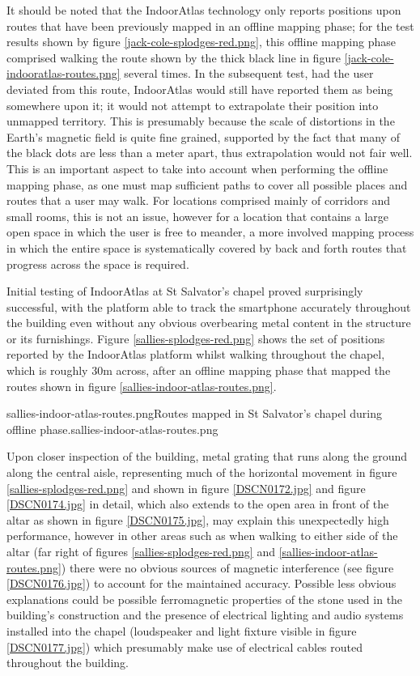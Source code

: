 It should be noted that the IndoorAtlas technology only reports positions upon routes that have been previously mapped in an offline mapping phase; for the test results shown by figure \ref{jack-cole-splodges-red.png}, this offline mapping phase comprised walking the route shown by the thick black line in figure \ref{jack-cole-indooratlas-routes.png} several times. In the subsequent test, had the user deviated from this route, IndoorAtlas would still have reported them as being somewhere upon it; it would not attempt to extrapolate their position into unmapped territory. This is presumably because the scale of distortions in the Earth's magnetic field is quite fine grained, supported by the fact that many of the black dots are less than a meter apart, thus extrapolation would not fair well. This is an important aspect to take into account when performing the offline mapping phase, as one must map sufficient paths to cover all possible places and routes that a user may walk. For locations comprised mainly of corridors and small rooms, this is not an issue, however for a location that contains a large open space in which the user is free to meander, a more involved mapping process in which the entire space is systematically covered by back and forth routes that progress across the space is required.

Initial testing of IndoorAtlas at St Salvator's chapel proved surprisingly successful, with the platform able to track the smartphone accurately throughout the building even without any obvious overbearing metal content in the structure or its furnishings. Figure \ref{sallies-splodges-red.png} shows the set of positions reported by the IndoorAtlas platform whilst walking throughout the chapel, which is roughly 30m across, after an offline mapping phase that mapped the routes shown in figure \ref{sallies-indoor-atlas-routes.png}.

       {sallies-indoor-atlas-routes.png}{Routes mapped in St Salvator's chapel during offline phase.}{sallies-indoor-atlas-routes.png}

Upon closer inspection of the building, metal grating that runs along the ground along the central aisle, representing much of the horizontal movement in figure \ref{sallies-splodges-red.png} and shown in figure \ref{DSCN0172.jpg} and figure \ref{DSCN0174.jpg} in detail, which also extends to the open area in front of the altar as shown in figure \ref{DSCN0175.jpg}, may explain this unexpectedly high performance, however in other areas such as when walking to either side of the altar (far right of figures \ref{sallies-splodges-red.png} and \ref{sallies-indoor-atlas-routes.png}) there were no obvious sources of magnetic interference (see figure \ref{DSCN0176.jpg}) to account for the maintained accuracy. Possible less obvious explanations could be possible ferromagnetic properties of the stone used in the building's construction and the presence of electrical lighting and audio systems installed into the chapel (loudspeaker and light fixture visible in figure \ref{DSCN0177.jpg}) which presumably make use of electrical cables routed throughout the building.

